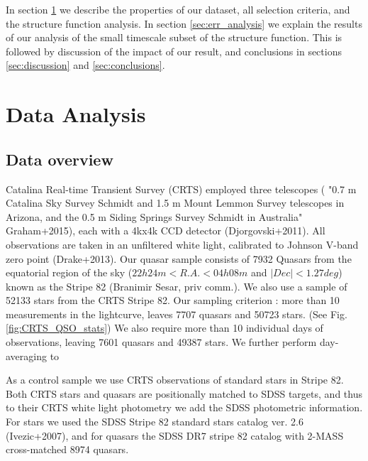 \documentclass[fleqn,usenatbib]{mnras}  %
\begin{document}
In section \ref{sec:obs} we describe the properties of our dataset, all selection criteria, and the structure function analysis.  In section \ref{sec:err_analysis} we explain the results of our analysis of the small timescale subset of the structure function. This is followed by discussion of the impact of our result, and conclusions in sections \ref{sec:discussion} and \ref{sec:conclusions}.
 

\section{Data Analysis}
\label{sec:obs}

\subsection{Data overview}

Catalina Real-time Transient Survey (CRTS) employed three telescopes ( "0.7 m Catalina Sky Survey Schmidt and 1.5 m Mount Lemmon Survey telescopes in Arizona, and the 0.5 m Siding Springs Survey Schmidt in Australia" Graham+2015), each with a  4kx4k CCD detector (Djorgovski+2011). All observations are taken in an unfiltered white light, calibrated to Johnson V-band zero point (Drake+2013). Our quasar sample consists of 7932 Quasars from the equatorial region of the sky ($22h 24m < R.A. < 04h 08m$ and $| Dec | < 1.27 deg$)  known as the Stripe 82 (Branimir Sesar, priv comm.). We also use a sample of 52133 stars from the CRTS Stripe 82. Our sampling criterion : more than 10 measurements in the lightcurve, leaves 7707 quasars and 50723 stars. (See Fig.\ref{fig:CRTS_QSO_stats}) We also require more than 10 individual days of observations, leaving  7601 quasars and 49387 stars.   We further perform day-averaging to 

As a control sample we use CRTS observations of standard stars in Stripe 82. Both CRTS stars and quasars are positionally matched to SDSS targets, and thus to their CRTS white light photometry  we add the SDSS photometric information. For stars we used the SDSS Stripe 82 standard stars catalog  ver. 2.6  (Ivezic+2007), and for quasars the SDSS DR7 stripe 82 catalog with 2-MASS cross-matched  8974 quasars.  
\end{document}
